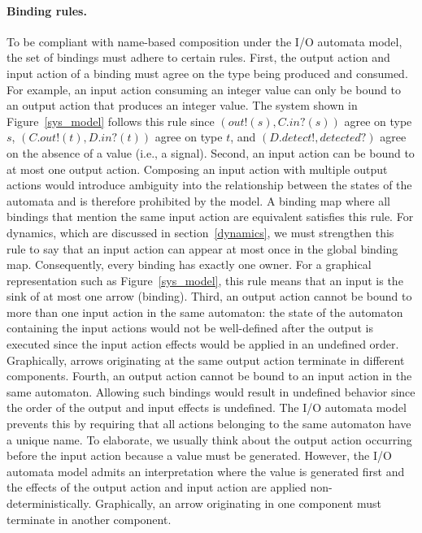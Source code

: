 \paragraph{Binding rules.}
To be compliant with name-based composition under the I/O automata model, the set of bindings must adhere to certain rules.
First, the output action and input action of a binding must agree on the type being produced and consumed.
For example, an input action consuming an integer value can only be bound to an output action that produces an integer value.
The system shown in Figure~\ref{sys_model} follows this rule since $(out!(s), C.in?(s))$ agree on type $s$, $(C.out!(t), D.in?(t))$ agree on type $t$, and $(D.detect!, detected?)$ agree on the absence of a value (i.e., a signal).
Second, an input action can be bound to at most one output action.
Composing an input action with multiple output actions would introduce ambiguity into the relationship between the states of the automata and is therefore prohibited by the model.
A binding map where all bindings that mention the same input action are equivalent satisfies this rule.
For dynamics, which are discussed in section~\ref{dynamics}, we must strengthen this rule to say that an input action can appear at most once in the global binding map.
Consequently, every binding has exactly one owner.
For a graphical representation such as Figure~\ref{sys_model}, this rule means that an input is the sink of at most one arrow (binding).
Third, an output action cannot be bound to more than one input action in the same automaton:  the state of the automaton containing the input actions would not be well-defined after the output is executed since the input action effects would be applied in an undefined order.
Graphically, arrows originating at the same output action terminate in different components.
Fourth, an output action cannot be bound to an input action in the same automaton.
Allowing such bindings would result in undefined behavior since the order of the output and input effects is undefined.
The I/O automata model prevents this by requiring that all actions belonging to the same automaton have a unique name.
To elaborate, we usually think about the output action occurring before the input action because a value must be generated.
However, the I/O automata model admits an interpretation where the value is generated first and the effects of the output action and input action are applied non-deterministically.
Graphically, an arrow originating in one component must terminate in another component.

